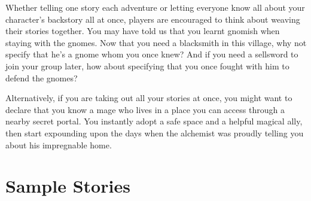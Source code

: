 \begin{multicols}{2}
Whether telling one story each \gls{adventure} or letting everyone know all about your character's backstory all at once, players are encouraged to think about weaving their stories together.
You may have told us that you learnt gnomish when staying with the gnomes.
Now that you need a blacksmith in this village, why not specify that he's a gnome whom you once knew?
And if you need a sellsword to join your group later, how about specifying that you once fought with him to defend the gnomes?

Alternatively, if you are taking out all your stories at once, you might want to declare that you know a mage who lives in a place you can access through a nearby secret portal.
You instantly adopt a safe space and a helpful magical ally, then start expounding upon the days when the alchemist was proudly telling you about his impregnable home.

\end{multicols}

\section{Sample Stories}

